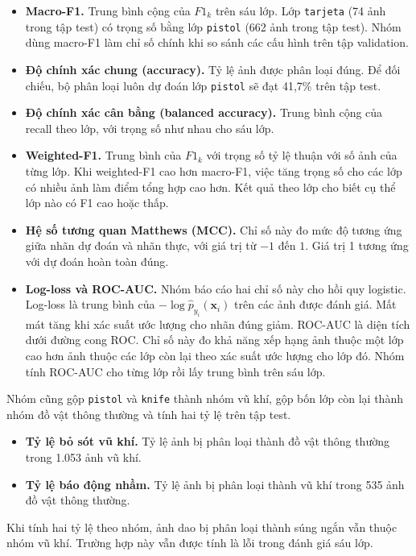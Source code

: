 \begin{itemize}
  \item \textbf{Macro-F1.} Trung bình cộng của $F1_k$ trên sáu lớp. Lớp \texttt{tarjeta} (74 ảnh trong tập test) có trọng số bằng lớp \texttt{pistol} (662 ảnh trong tập test). Nhóm dùng macro-F1 làm chỉ số chính khi so sánh các cấu hình trên tập validation.
  \item \textbf{Độ chính xác chung (accuracy).} Tỷ lệ ảnh được phân loại đúng. Để đối chiếu, bộ phân loại luôn dự đoán lớp \texttt{pistol} sẽ đạt 41,7\% trên tập test.
  \item \textbf{Độ chính xác cân bằng (balanced accuracy).} Trung bình cộng của recall theo lớp, với trọng số như nhau cho sáu lớp.
  \item \textbf{Weighted-F1.} Trung bình của $F1_k$ với trọng số tỷ lệ thuận với số ảnh của từng lớp. Khi weighted-F1 cao hơn macro-F1, việc tăng trọng số cho các lớp có nhiều ảnh làm điểm tổng hợp cao hơn. Kết quả theo lớp cho biết cụ thể lớp nào có F1 cao hoặc thấp.
  \item \textbf{Hệ số tương quan Matthews (MCC).} Chỉ số này đo mức độ tương ứng giữa nhãn dự đoán và nhãn thực, với giá trị từ $-1$ đến $1$. Giá trị 1 tương ứng với dự đoán hoàn toàn đúng.
  \item \textbf{Log-loss và ROC-AUC.} Nhóm báo cáo hai chỉ số này cho hồi quy logistic. Log-loss là trung bình của $-\log \hat{p}_{y_i}(\mathbf{x}_i)$ trên các ảnh được đánh giá. Mất mát tăng khi xác suất ước lượng cho nhãn đúng giảm. ROC-AUC là diện tích dưới đường cong ROC. Chỉ số này đo khả năng xếp hạng ảnh thuộc một lớp cao hơn ảnh thuộc các lớp còn lại theo xác suất ước lượng cho lớp đó. Nhóm tính ROC-AUC cho từng lớp rồi lấy trung bình trên sáu lớp.
\end{itemize}

Nhóm cũng gộp \texttt{pistol} và \texttt{knife} thành nhóm vũ khí, gộp bốn lớp còn lại thành nhóm đồ vật thông thường và tính hai tỷ lệ trên tập test.
\begin{itemize}
  \item \textbf{Tỷ lệ bỏ sót vũ khí.} Tỷ lệ ảnh bị phân loại thành đồ vật thông thường trong 1.053 ảnh vũ khí.
  \item \textbf{Tỷ lệ báo động nhầm.} Tỷ lệ ảnh bị phân loại thành vũ khí trong 535 ảnh đồ vật thông thường.
\end{itemize}
Khi tính hai tỷ lệ theo nhóm, ảnh dao bị phân loại thành súng ngắn vẫn thuộc nhóm vũ khí. Trường hợp này vẫn được tính là lỗi trong đánh giá sáu lớp.

